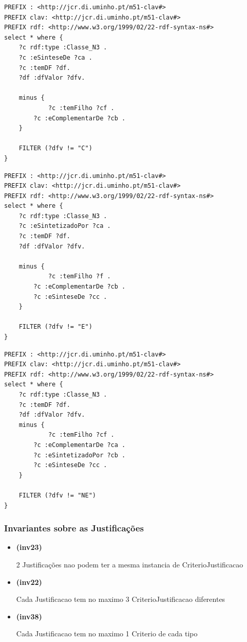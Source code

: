 \documentclass[tikz,runningheads,a4paper]{llncs}
\begin{document}
\begin{subappendices}
\begin{lstlisting}[language=sparql, frame=single, basicstyle=\scriptsize]
PREFIX : <http://jcr.di.uminho.pt/m51-clav#>
PREFIX clav: <http://jcr.di.uminho.pt/m51-clav#>
PREFIX rdf: <http://www.w3.org/1999/02/22-rdf-syntax-ns#>
select * where {
    ?c rdf:type :Classe_N3 .
    ?c :eSinteseDe ?ca .
    ?c :temDF ?df.
    ?df :dfValor ?dfv.
    
    minus {
            ?c :temFilho ?cf .
        ?c :eComplementarDe ?cb .
    }

    FILTER (?dfv != "C")
}
\end{lstlisting}

\begin{lstlisting}[language=sparql, frame=single, basicstyle=\scriptsize]
PREFIX : <http://jcr.di.uminho.pt/m51-clav#>
PREFIX clav: <http://jcr.di.uminho.pt/m51-clav#>
PREFIX rdf: <http://www.w3.org/1999/02/22-rdf-syntax-ns#>
select * where {
    ?c rdf:type :Classe_N3 .
    ?c :eSintetizadoPor ?ca .
    ?c :temDF ?df.
    ?df :dfValor ?dfv.

    minus {
            ?c :temFilho ?f .
        ?c :eComplementarDe ?cb .
        ?c :eSinteseDe ?cc .
    }

    FILTER (?dfv != "E")
}
\end{lstlisting}

\begin{lstlisting}[language=sparql, frame=single, basicstyle=\scriptsize]
PREFIX : <http://jcr.di.uminho.pt/m51-clav#>
PREFIX clav: <http://jcr.di.uminho.pt/m51-clav#>
PREFIX rdf: <http://www.w3.org/1999/02/22-rdf-syntax-ns#>
select * where {
    ?c rdf:type :Classe_N3 .
    ?c :temDF ?df.
    ?df :dfValor ?dfv.
    minus {
            ?c :temFilho ?cf .
        ?c :eComplementarDe ?ca .
        ?c :eSintetizadoPor ?cb .
        ?c :eSinteseDe ?cc .
    }
    
    FILTER (?dfv != "NE")
}
\end{lstlisting}

\hypertarget{invariantes-sobre-as-justificacoes}{%
\subsubsection{Invariantes sobre as
Justificações}\label{invariantes-sobre-as-justificauxe7uxf5es}}

\begin{itemize}
\tightlist
\item
  \hypertarget{inv23}{\textbf{(inv23)}} 2 Justificações nao podem ter a mesma instancia de
  CriterioJustificacao
\item
  \hypertarget{inv22}{\textbf{(inv22)}} Cada Justificacao tem no maximo 3
  CriterioJustificacao diferentes
\item
  \hypertarget{inv38}{\textbf{(inv38)}} Cada Justificacao tem no maximo 1 Criterio de cada
  tipo
\end{itemize}



\end{subappendices}
\end{document}
